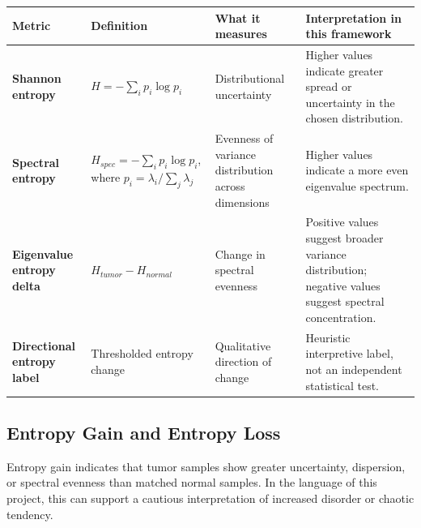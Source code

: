 \documentclass[
  letterpaper,
  DIV=11,
  numbers=noendperiod,
  openany,
  oneside]{scrreprt}
\begin{document}
\begin{longtable}[]{@{}
  >{\raggedright\arraybackslash}p{}
  >{\raggedright\arraybackslash}p{}
  >{\raggedright\arraybackslash}p{}
  >{\raggedright\arraybackslash}p{}@{}}
\toprule\noalign{}
\begin{minipage}[b]{\linewidth}\raggedright
Metric
\end{minipage} & \begin{minipage}[b]{\linewidth}\raggedright
Definition
\end{minipage} & \begin{minipage}[b]{\linewidth}\raggedright
What it measures
\end{minipage} & \begin{minipage}[b]{\linewidth}\raggedright
Interpretation in this framework
\end{minipage} \\
\midrule\noalign{}
\endhead
\bottomrule\noalign{}
\endlastfoot
\textbf{Shannon entropy} & \(H = -\sum_i p_i \log p_i\) & Distributional
uncertainty & Higher values indicate greater spread or uncertainty in
the chosen distribution. \\
\textbf{Spectral entropy} & \(H_{spec} = -\sum_i p_i \log p_i\), where
\(p_i = \lambda_i / \sum_j \lambda_j\) & Evenness of variance
distribution across dimensions & Higher values indicate a more even
eigenvalue spectrum. \\
\textbf{Eigenvalue entropy delta} & \(H_{tumor} - H_{normal}\) & Change
in spectral evenness & Positive values suggest broader variance
distribution; negative values suggest spectral concentration. \\
\textbf{Directional entropy label} & Thresholded entropy change &
Qualitative direction of change & Heuristic interpretive label, not an
independent statistical test. \\
\end{longtable}

\subsection{Entropy Gain and Entropy
Loss}\label{entropy-gain-and-entropy-loss}

Entropy gain indicates that tumor samples show greater uncertainty,
dispersion, or spectral evenness than matched normal samples. In the
language of this project, this can support a cautious interpretation of
increased disorder or chaotic tendency.
\end{document}
